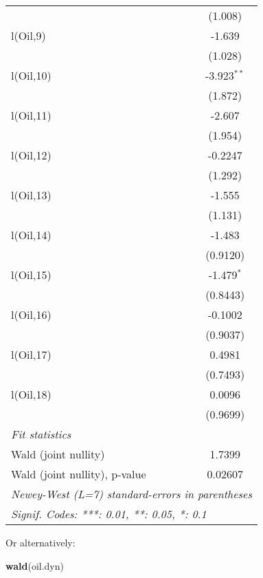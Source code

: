 \documentclass[
]{article}
\newenvironment{Shaded}{\begin{snugshade}}{\end{snugshade}}
\newcommand{\FunctionTok}[1]{\textcolor[rgb]{0.13,0.29,0.53}{\textbf{#1}}}
\newcommand{\NormalTok}[1]{#1}
\begin{document}
\begin{tabular}{lc}
                                 & (1.008)\\   
   l(Oil,9)                      & -1.639\\   
                                 & (1.028)\\   
   l(Oil,10)                     & -3.923$^{**}$\\   
                                 & (1.872)\\   
   l(Oil,11)                     & -2.607\\   
                                 & (1.954)\\   
   l(Oil,12)                     & -0.2247\\   
                                 & (1.292)\\   
   l(Oil,13)                     & -1.555\\   
                                 & (1.131)\\   
   l(Oil,14)                     & -1.483\\   
                                 & (0.9120)\\   
   l(Oil,15)                     & -1.479$^{*}$\\   
                                 & (0.8443)\\   
   l(Oil,16)                     & -0.1002\\   
                                 & (0.9037)\\   
   l(Oil,17)                     & 0.4981\\   
                                 & (0.7493)\\   
   l(Oil,18)                     & 0.0096\\   
                                 & (0.9699)\\   
   \midrule
   \emph{Fit statistics}\\
   Wald (joint nullity)          & 1.7399\\  
   Wald (joint nullity), p-value & 0.02607\\  
   \midrule \midrule
   \multicolumn{2}{l}{\emph{Newey-West (L=7) standard-errors in parentheses}}\\
   \multicolumn{2}{l}{\emph{Signif. Codes: ***: 0.01, **: 0.05, *: 0.1}}\\
\end{tabular}
\par\endgroup

Or alternatively:

\begin{Shaded}
\begin{Highlighting}[]
\FunctionTok{wald}\NormalTok{(oil.dyn)}
\end{Highlighting}
\end{Shaded}
\end{document}

